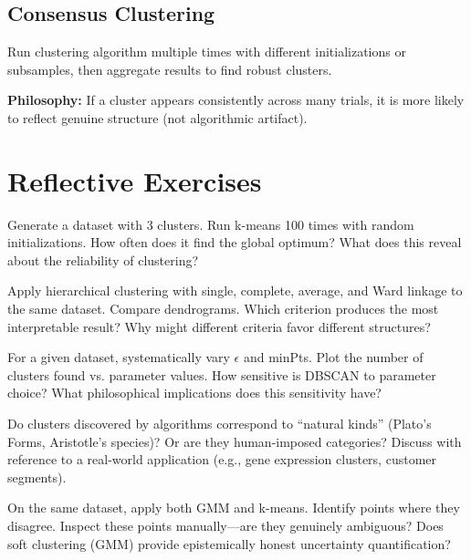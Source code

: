 \subsection{Consensus Clustering}

\begin{definition}
Run clustering algorithm multiple times with different initializations or subsamples, then aggregate results to find robust clusters.

\textbf{Philosophy:} If a cluster appears consistently across many trials, it is more likely to reflect genuine structure (not algorithmic artifact).
\end{definition}

\section{Reflective Exercises}

\begin{exercise}
Generate a dataset with 3 clusters. Run k-means 100 times with random initializations. How often does it find the global optimum? What does this reveal about the reliability of clustering?
\end{exercise}

\begin{exercise}
Apply hierarchical clustering with single, complete, average, and Ward linkage to the same dataset. Compare dendrograms. Which criterion produces the most interpretable result? Why might different criteria favor different structures?
\end{exercise}

\begin{exercise}
For a given dataset, systematically vary $\epsilon$ and minPts. Plot the number of clusters found vs. parameter values. How sensitive is DBSCAN to parameter choice? What philosophical implications does this sensitivity have?
\end{exercise}

\begin{exercise}
Do clusters discovered by algorithms correspond to ``natural kinds'' (Plato's Forms, Aristotle's species)? Or are they human-imposed categories? Discuss with reference to a real-world application (e.g., gene expression clusters, customer segments).
\end{exercise}

\begin{exercise}
On the same dataset, apply both GMM and k-means. Identify points where they disagree. Inspect these points manually---are they genuinely ambiguous? Does soft clustering (GMM) provide epistemically honest uncertainty quantification?
\end{exercise}

